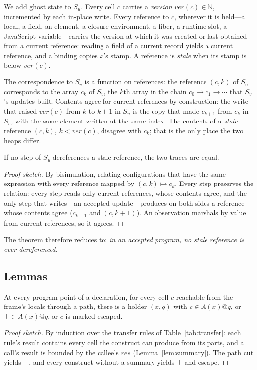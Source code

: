 We add ghost state to $S_u$. Every cell $c$ carries a \emph{version} $\mathit{ver}(c) \in \mathbb{N}$,
incremented by each in-place write. Every reference to $c$, wherever it is held---a local, a field, an
element, a closure environment, a fiber, a runtime slot, a JavaScript variable---carries the version
at which it was created or last obtained from a current reference: reading a field of a current record
yields a current reference, and a binding  copies $x$'s stamp. A reference is \emph{stale}
when its stamp is below $\mathit{ver}(c)$.

The correspondence to $S_v$ is a function on references: the reference $(c, k)$ of $S_u$ corresponds to
the array $c_k$ of $S_v$, the $k$th array in the chain $c_0 \to c_1 \to \cdots$ that $S_v$'s updates
built. Contents agree for current references by construction: the write that raised $\mathit{ver}(c)$
from $k$ to $k+1$ in $S_u$ is the copy that made $c_{k+1}$ from $c_k$ in $S_v$, with the same element
written at the same index. The contents of a \emph{stale} reference $(c, k)$, $k < \mathit{ver}(c)$,
disagree with $c_k$; that is the only place the two heaps differ.

\begin{lemma}
\label{lem:stale}
If no step of $S_u$ dereferences a stale reference, the two traces are equal.
\end{lemma}
\begin{proof}[Proof sketch]
By bisimulation, relating configurations that have the same expression with every reference mapped
by $(c, k) \mapsto c_k$. Every step preserves the relation: every step reads only current references,
whose contents agree, and the only step that writes---an accepted update---produces on both sides a
reference whose contents agree ($c_{k+1}$ and $(c, k+1)$). An observation marshals by value from
current references, so it agrees.
\end{proof}

The theorem therefore reduces to: \emph{in an accepted program, no stale reference is ever
dereferenced}.

\subsection{Lemmas}

\begin{lemma}
\label{lem:flow}
At every program point of a declaration, for every cell $c$ reachable from the frame's locals through
a path, there is a holder $(x, q)$ with $c \in A(x)@q$, or $\top \in A(x)@q$, or $c$ is marked escaped.
\end{lemma}
\begin{proof}[Proof sketch]
By induction over the transfer rules of Table~\ref{tab:transfer}: each rule's result contains every
cell the construct can produce from its parts, and a call's result is bounded by the callee's
$\mathit{res}$ (Lemma~\ref{lem:summary}). The path cut yields $\top$, and every construct without a
summary yields $\top$ and escape.
\end{proof}

